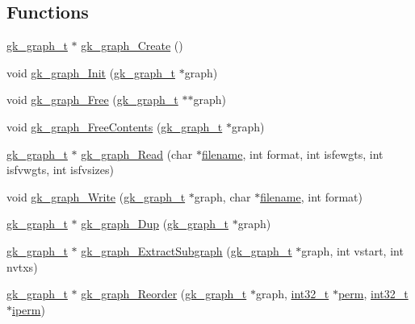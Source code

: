 \subsection*{Functions}
\begin{DoxyCompactItemize}
\item 
\hyperlink{a00638}{gk\+\_\+graph\+\_\+t} $\ast$ \hyperlink{a00846_a0d092a371d797437de53ae1a64bd78f4}{gk\+\_\+graph\+\_\+\+Create} ()
\item 
void \hyperlink{a00846_ab017e0e6f2436f3ad24ea01d8b2c588c}{gk\+\_\+graph\+\_\+\+Init} (\hyperlink{a00638}{gk\+\_\+graph\+\_\+t} $\ast$graph)
\item 
void \hyperlink{a00846_a1c12a8da8ea4064302668e0ce94ad462}{gk\+\_\+graph\+\_\+\+Free} (\hyperlink{a00638}{gk\+\_\+graph\+\_\+t} $\ast$$\ast$graph)
\item 
void \hyperlink{a00846_a00a7be5e2819fb9444360695e8d047d3}{gk\+\_\+graph\+\_\+\+Free\+Contents} (\hyperlink{a00638}{gk\+\_\+graph\+\_\+t} $\ast$graph)
\item 
\hyperlink{a00638}{gk\+\_\+graph\+\_\+t} $\ast$ \hyperlink{a00846_a432baae7f5c91c3604b42efb324b4131}{gk\+\_\+graph\+\_\+\+Read} (char $\ast$\hyperlink{a00623_a42a21beb8018ac623f4d09db1343b9cf}{filename}, int format, int isfewgts, int isfvwgts, int isfvsizes)
\item 
void \hyperlink{a00846_a92bfa3f7bc76f9fb591ad67f665383e9}{gk\+\_\+graph\+\_\+\+Write} (\hyperlink{a00638}{gk\+\_\+graph\+\_\+t} $\ast$graph, char $\ast$\hyperlink{a00623_a42a21beb8018ac623f4d09db1343b9cf}{filename}, int format)
\item 
\hyperlink{a00638}{gk\+\_\+graph\+\_\+t} $\ast$ \hyperlink{a00846_a24db906b45a9848fc26c49cb967d68c8}{gk\+\_\+graph\+\_\+\+Dup} (\hyperlink{a00638}{gk\+\_\+graph\+\_\+t} $\ast$graph)
\item 
\hyperlink{a00638}{gk\+\_\+graph\+\_\+t} $\ast$ \hyperlink{a00846_a1d2e1fe0550575de31f32a8c146f6643}{gk\+\_\+graph\+\_\+\+Extract\+Subgraph} (\hyperlink{a00638}{gk\+\_\+graph\+\_\+t} $\ast$graph, int vstart, int nvtxs)
\item 
\hyperlink{a00638}{gk\+\_\+graph\+\_\+t} $\ast$ \hyperlink{a00846_aab929d2134ffb92863867c93a0ce1f27}{gk\+\_\+graph\+\_\+\+Reorder} (\hyperlink{a00638}{gk\+\_\+graph\+\_\+t} $\ast$graph, \hyperlink{a00119_a37994e3b11c72957c6f454c6ec96d43d}{int32\+\_\+t} $\ast$\hyperlink{a00879_ab96e9eb84fc7c342d17690a1341645dd}{perm}, \hyperlink{a00119_a37994e3b11c72957c6f454c6ec96d43d}{int32\+\_\+t} $\ast$\hyperlink{a00879_a76ba0ee1ced7914ce87ac7eab1758c42}{iperm})
\item 
$$
\end{DoxyCompactItemize}
